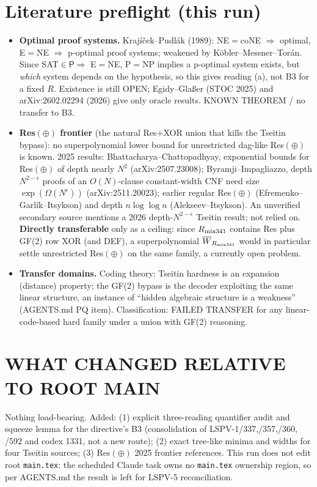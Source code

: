 \documentclass[11pt]{article}
\newcommand{\W}{\overline W}
\begin{document}
\section{Literature preflight (this run)}
\begin{itemize}
\item \textbf{Optimal proof systems.} Krajíček--Pudlák (1989): NE$=$coNE
$\Rightarrow$ optimal, E$=$NE $\Rightarrow$ p-optimal proof systems; weakened by
Köbler--Messner--Torán. Since SAT$\in\mathsf P\Rightarrow$ E$=$NE, P$=$NP implies
a p-optimal system exists, but \emph{which} system depends on the hypothesis,
so this gives reading (a), not B3 for a fixed $R$. Existence is still OPEN;
Egidy--Glaßer (STOC 2025) and arXiv:2602.02294 (2026) give only oracle
results. KNOWN THEOREM / no transfer to B3.
\item \textbf{Res$(\oplus)$ frontier} (the natural Res$+$XOR union that kills
the Tseitin bypass): no superpolynomial lower bound for unrestricted
dag-like Res$(\oplus)$ is known. 2025 results: Bhattacharya--Chattopadhyay,
exponential bounds for Res$(\oplus)$ of depth nearly $N^2$
(arXiv:2507.23008); Byramji--Impagliazzo, depth $N^{2-\epsilon}$ proofs of an
$O(N)$-clause constant-width CNF need size $\exp(\Omega(N^\epsilon))$
(arXiv:2511.20023); earlier regular Res$(\oplus)$ (Efremenko--Garlík--Itsykson)
and depth $n\log\log n$ (Alekseev--Itsykson). An unverified secondary source
mentions a 2026 depth-$N^{2-\epsilon}$ Tseitin result; not relied on.
\textbf{Directly transferable} only as a ceiling: since $R_{\rm mix341}$
contains Res plus GF(2) row XOR (and DEF), a superpolynomial $\W_{R_{\rm mix341}}$
would in particular settle unrestricted Res$(\oplus)$ on the same family, a
currently open problem.
\item \textbf{Transfer domains.} Coding theory: Tseitin hardness is an
expansion (distance) property; the GF(2) bypass is the decoder exploiting the
same linear structure, an instance of ``hidden algebraic structure is a
weakness'' (AGENTS.md PQ item). Classification: FAILED TRANSFER for any
linear-code-based hard family under a union with GF(2) reasoning.
\end{itemize}

\section*{WHAT CHANGED RELATIVE TO ROOT MAIN}
Nothing load-bearing. Added: (1) explicit three-reading quantifier audit and
squeeze lemma for the directive's B3 (consolidation of LSPV-1/337,/357,/360,
/592 and codex 1331, not a new route); (2) exact tree-like minima and widths
for four Tseitin sources; (3) Res$(\oplus)$ 2025 frontier references.
This run does not edit root \texttt{main.tex}: the scheduled Claude task owns
no \texttt{main.tex} ownership region, so per AGENTS.md the result is left
for LSPV-5 reconciliation.
\end{document}
